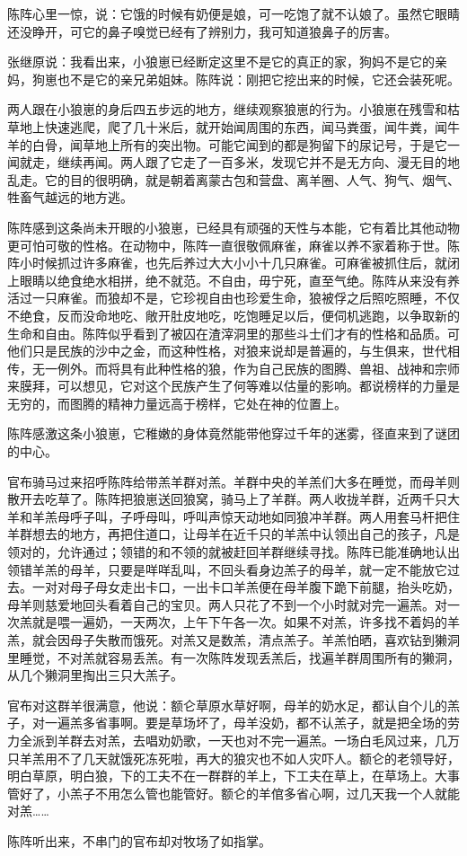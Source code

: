 \par 陈阵心里一惊，说：它饿的时候有奶便是娘，可一吃饱了就不认娘了。虽然它眼睛还没睁开，可它的鼻子嗅觉已经有了辨别力，我可知道狼鼻子的厉害。
\par 张继原说：我看出来，小狼崽已经断定这里不是它的真正的家，狗妈不是它的亲妈，狗崽也不是它的亲兄弟姐妹。陈阵说：刚把它挖出来的时候，它还会装死呢。
\par 两人跟在小狼崽的身后四五步远的地方，继续观察狼崽的行为。小狼崽在残雪和枯草地上快速逃爬，爬了几十米后，就开始闻周围的东西，闻马粪蛋，闻牛粪，闻牛羊的白骨，闻草地上所有的突出物。可能它闻到的都是狗留下的尿记号，于是它一闻就走，继续再闻。两人跟了它走了一百多米，发现它并不是无方向、漫无目的地乱走。它的目的很明确，就是朝着离蒙古包和营盘、离羊圈、人气、狗气、烟气、牲畜气越远的地方逃。
\par 陈阵感到这条尚未开眼的小狼崽，已经具有顽强的天性与本能，它有着比其他动物更可怕可敬的性格。在动物中，陈阵一直很敬佩麻雀，麻雀以养不家着称于世。陈阵小时候抓过许多麻雀，也先后养过大大小小十几只麻雀。可麻雀被抓住后，就闭上眼睛以绝食绝水相拼，绝不就范。不自由，毋宁死，直至气绝。陈阵从来没有养活过一只麻雀。而狼却不是，它珍视自由也珍爱生命，狼被俘之后照吃照睡，不仅不绝食，反而没命地吃、敞开肚皮地吃，吃饱睡足以后，便伺机逃跑，以争取新的生命和自由。陈阵似乎看到了被囚在渣滓洞里的那些斗士们才有的性格和品质。可他们只是民族的沙中之金，而这种性格，对狼来说却是普遍的，与生俱来，世代相传，无一例外。而将具有此种性格的狼，作为自己民族的图腾、兽祖、战神和宗师来膜拜，可以想见，它对这个民族产生了何等难以估量的影响。都说榜样的力量是无穷的，而图腾的精神力量远高于榜样，它处在神的位置上。
\par 陈阵感激这条小狼崽，它稚嫩的身体竟然能带他穿过千年的迷雾，径直来到了谜团的中心。
\par 
\par 官布骑马过来招呼陈阵给带羔羊群对羔。羊群中央的羊羔们大多在睡觉，而母羊则散开去吃草了。陈阵把狼崽送回狼窝，骑马上了羊群。两人收拢羊群，近两千只大羊和羊羔母呼子叫，子呼母叫，呼叫声惊天动地如同狼冲羊群。两人用套马杆把住羊群想去的地方，再把住道口，让母羊在近千只的羊羔中认领出自己的孩子，凡是领对的，允许通过；领错的和不领的就被赶回羊群继续寻找。陈阵已能准确地认出领错羊羔的母羊，只要是咩咩乱叫，不回头看身边羔子的母羊，就一定不能放它过去。一对对母子母女走出卡口，一出卡口羊羔便在母羊腹下跪下前腿，抬头吃奶，母羊则慈爱地回头看着自己的宝贝。两人只花了不到一个小时就对完一遍羔。对一次羔就是喂一遍奶，一天两次，上午下午各一次。如果不对羔，许多找不着妈的羊羔，就会因母子失散而饿死。对羔又是数羔，清点羔子。羊羔怕晒，喜欢钻到獭洞里睡觉，不对羔就容易丢羔。有一次陈阵发现丢羔后，找遍羊群周围所有的獭洞，从几个獭洞里掏出三只大羔子。
\par 官布对这群羊很满意，他说：额仑草原水草好啊，母羊的奶水足，都认自个儿的羔子，对一遍羔多省事啊。要是草场坏了，母羊没奶，都不认羔子，就是把全场的劳力全派到羊群去对羔，去唱劝奶歌，一天也对不完一遍羔。一场白毛风过来，几万只羊羔用不了几天就饿死冻死啦，再大的狼灾也不如人灾吓人。额仑的老领导好，明白草原，明白狼，下的工夫不在一群群的羊上，下工夫在草上，在草场上。大事管好了，小羔子不用怎么管也能管好。额仑的羊倌多省心啊，过几天我一个人就能对羔……
\par 陈阵听出来，不串门的官布却对牧场了如指掌。




